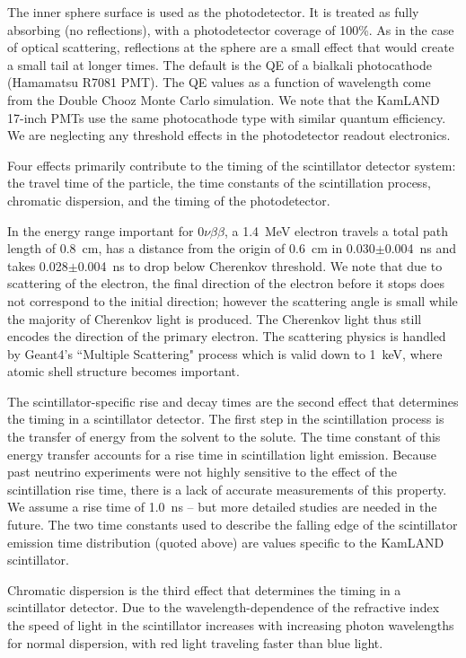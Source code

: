 The inner sphere surface is used as the photodetector. It is treated
as fully absorbing (no reflections), with a photodetector coverage of
100\%. As in the case of optical scattering, reflections at the sphere are a small effect that would create a small tail at longer times. The default is the QE of a bialkali photocathode (Hamamatsu
R7081 PMT)\cite{Hamamatsu_R7081}. The QE values as a function of wavelength come from the Double Chooz\cite{dctwo}
Monte Carlo simulation. We note that the KamLAND 17-inch PMTs use the
same photocathode type with similar quantum efficiency. We are neglecting any threshold effects in the photodetector readout electronics.


Four effects primarily contribute to the timing of the scintillator detector
system: the travel time of the particle, the time constants of the scintillation process, chromatic dispersion, and the timing of the photodetector.

In the energy range important for $0\nu\beta\beta$, a 1.4~MeV electron travels a total path length of 0.8~cm, has a distance from the origin of 0.6~cm in 0.030$\pm$0.004~ns  and takes 0.028$\pm$0.004~ns to drop below Cherenkov threshold. We note that due to scattering of the electron, the final direction of the electron before it stops does not correspond to the initial direction; however the scattering angle is small while the majority of Cherenkov light is produced. The Cherenkov light thus still encodes the direction of the primary electron. The scattering physics is handled by Geant4's ``Multiple Scattering" process which is valid down to 1~keV, where atomic shell structure becomes important\cite{geant4scatt}.


The scintillator-specific rise and decay times are the second effect that determines the timing in a scintillator detector. The first step in the scintillation process is the transfer of energy from the solvent to the solute. The time constant of this
energy transfer accounts for a rise time in scintillation light
emission. Because past neutrino experiments were not highly sensitive to the
effect of the scintillation rise time, there is a lack of accurate measurements of this property. We assume a rise time of 1.0~ns -- but more
detailed studies are needed in the future. The two time constants used
to describe the falling edge of the scintillator emission time
distribution (quoted above) are values specific to the KamLAND scintillator.

Chromatic dispersion is the third effect that determines the timing in a scintillator detector. Due to the wavelength-dependence of the refractive index the speed of
light in the scintillator increases
with increasing photon wavelengths for normal dispersion, with red
light traveling faster than blue light.

